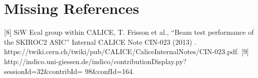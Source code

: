 \section{Missing References}
[8] SiW Ecal group within CALICE, T. Frisson et al., “Beam test performance of the SKIROC2 ASIC” Internal CALICE Note CIN-023 (2013) . https://twiki.cern.ch/twiki/pub/CALICE/CaliceInternalNotes/CIN-023.pdf.
[9] http://indico.uni-giessen.de/indico/contributionDisplay.py?sessionId=32\&contribId= 98\&confId=164.

